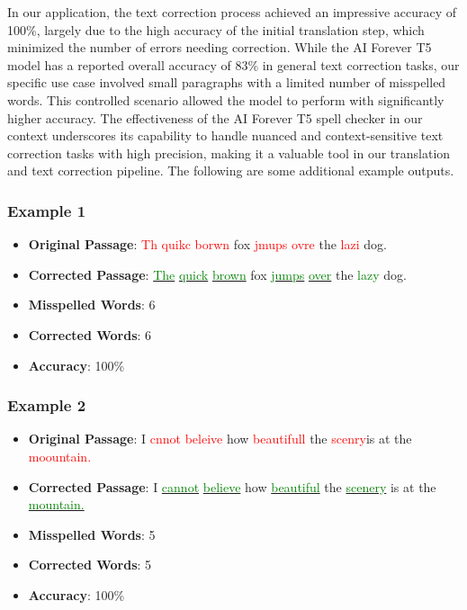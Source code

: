 In our application, the text correction process achieved an impressive accuracy of 100\%, largely due to the high accuracy of the initial translation step, which minimized the number of errors needing correction. While the AI Forever T5 model has a reported overall accuracy of 83\% in general text correction tasks, our specific use case involved small paragraphs with a limited number of misspelled words. This controlled scenario allowed the model to perform with significantly higher accuracy. The effectiveness of the AI Forever T5 spell checker in our context underscores its capability to handle nuanced and context-sensitive text correction tasks with high precision, making it a valuable tool in our translation and text correction pipeline. The following are some additional example outputs.



\subsubsection*{Example 1}
\begin{itemize}
    \item \textbf{Original Passage}: \textcolor{red}{Th} \textcolor{red}{quikc} \textcolor{red}{borwn} fox \textcolor{red}{jmups} \textcolor{red}{ovre} the \textcolor{red}{lazi} dog.
    \item \textbf{Corrected Passage}: \uline{\textcolor{green}{The}} \uline{\textcolor{green}{quick}} \uline{\textcolor{green}{brown}} fox \uline{\textcolor{green}{jumps}} \uline{\textcolor{green}{over}} the \textcolor{green}{lazy} dog.
    \item \textbf{Misspelled Words}: 6
    \item \textbf{Corrected Words}: 6
    \item \textbf{Accuracy}: 100\%
\end{itemize}

\subsubsection*{Example 2}
\begin{itemize}
    \item \textbf{Original Passage}: I \textcolor{red}{cnnot} \textcolor{red}{beleive} how \textcolor{red}{beautifull} the \textcolor{red}{scenry}is at the \textcolor{red}{moountain.}
    \item \textbf{Corrected Passage}: I \uline{\textcolor{green}{cannot}} \uline{\textcolor{green}{believe}} how \uline{\textcolor{green}{beautiful}} the \uline{\textcolor{green}{scenery}} is at the \uline{\textcolor{green}{mountain.}}
    \item \textbf{Misspelled Words}: 5
    \item \textbf{Corrected Words}: 5
    \item \textbf{Accuracy}: 100\%
\end{itemize}

